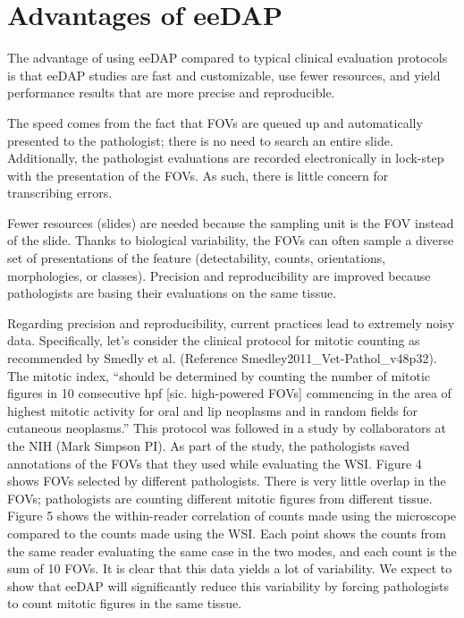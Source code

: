 \documentclass{article}%
\begin{document}
\section{Advantages of eeDAP}

\label{advantages-of-eedap}

The advantage of using eeDAP compared to typical clinical evaluation protocols
is that eeDAP studies are fast and customizable, use fewer resources, and
yield performance results that are more precise and reproducible.

The speed comes from the fact that FOVs are queued up and automatically
presented to the pathologist; there is no need to search an entire slide.
Additionally, the pathologist evaluations are recorded electronically in
lock-step with the presentation of the FOVs. As such, there is little concern
for transcribing errors.

Fewer resources (slides) are needed because the sampling unit is the FOV
instead of the slide. Thanks to biological variability, the FOVs can often
sample a diverse set of presentations of the feature (detectability, counts,
orientations, morphologies, or classes). Precision and reproducibility are
improved because pathologists are basing their evaluations on the same tissue.

Regarding precision and reproducibility, current practices lead to extremely
noisy data. Specifically, let's consider the clinical protocol for mitotic
counting as recommended by Smedly et al. (Reference
Smedley2011\_Vet-Pathol\_v48p32). The mitotic index, ``should be determined by
counting the number of mitotic figures in 10 consecutive hpf {[}sic.
high-powered FOVs{]} commencing in the area of highest mitotic activity for
oral and lip neoplasms and in random fields for cutaneous neoplasms.'' This
protocol was followed in a study by collaborators at the NIH (Mark Simpson
PI). As part of the study, the pathologists saved annotations of the FOVs that
they used while evaluating the WSI. Figure 4 shows FOVs selected by different
pathologists. There is very little overlap in the FOVs; pathologists are
counting different mitotic figures from different tissue. Figure 5 shows the
within-reader correlation of counts made using the microscope compared to the
counts made using the WSI. Each point shows the counts from the same reader
evaluating the same case in the two modes, and each count is the sum of 10
FOVs. It is clear that this data yields a lot of variability. We expect to
show that eeDAP will significantly reduce this variability by forcing
pathologists to count mitotic figures in the same tissue.
\end{document}
